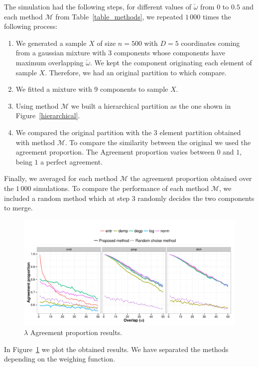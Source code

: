 \documentclass[10pt, a4paper]{article}
\begin{document}
\begin{spacing}{1.9}
The simulation had the following steps, for different values of $\check{\omega}$ from $0$ to $0.5$ and each method $\mathcal{M}$ from Table~\ref{table_methods},  we repeated $1\,000$ times the following process:
\begin{enumerate}
\item We generated a sample $X$ of size $n=500$ with $D=5$ coordinates coming from a gaussian mixture with $3$ components whose components have maximum overlapping $\check{\omega}$. We kept the component originating each element of sample $X$. Therefore, we had an original partition to which compare.
\item We fitted a mixture with 9 components to sample $X$.
\item Using method $\mathcal{M}$ we built a hierarchical partition as the one shown in Figure~\ref{hierarchical}.
\item We compared the original partition with the 3 element partition obtained with method $\mathcal{M}$. To compare the similarity between the original we used the agreement proportion. The Agreement proportion varies between $0$ and $1$, being $1$ a perfect agreement.
\end{enumerate}

Finally, we averaged for each method $\mathcal{M}$ the agreement proportion obtained over the $1\,000$ simulations.  To compare the performance of each method $\mathcal{M}$, we included a random method which at step $3$  randomly decides the two components to merge. 

\begin{figure}[!h]
\centering
\includegraphics[width=\textwidth]{linesagreement.pdf}
\caption{$\lambda$ Agreement proportion results.}
\label{fig:mub}
\end{figure}

In Figure~\ref{fig:mub} we plot the obtained results. We have separated the methods depending on the weighing function.


\end{spacing}
\end{document}
